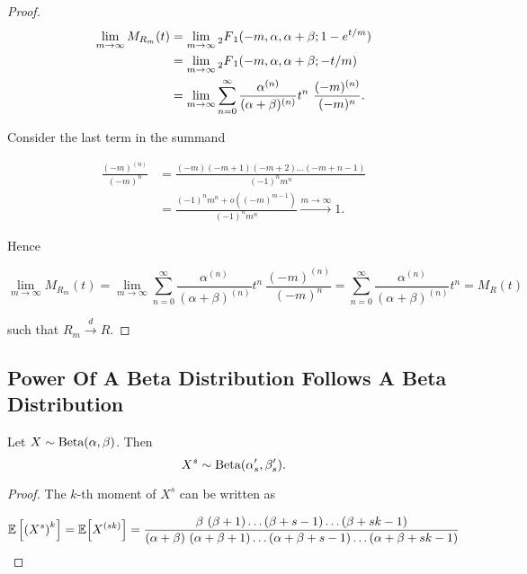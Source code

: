 \documentclass[../../main.tex]{subfiles}
\begin{document}
\begin{proof}
    \begin{equation}
        \begin{split}
            \lim_{m \rightarrow \infty} M_{R_m}(t) &= \lim_{m \rightarrow \infty} \prescript{}{2}{F}_1(-m, \alpha, \alpha + \beta; 1 - e^{t / m})\\
            &= \lim_{m \rightarrow \infty} \prescript{}{2}{F}_1(-m, \alpha, \alpha + \beta; - t/ m) \\
            &= \lim_{m \rightarrow \infty}\sum^{\infty}_{n=0} \frac{\alpha^{(n)}}{(\alpha + \beta)^{(n)}} t^n \  \frac{(-m)^{(n)}}{(-m)^n}.
        \end{split}
    \end{equation}

    
    Consider the last term in the summand 

    \begin{equation}
        \begin{split}
            \frac{(-m)^{(n)}}{(-m)^n} &= \frac{(-m)(-m + 1)(-m + 2)\ldots(-m + n - 1)}{(-1)^n m^n} \\
            &= \frac{(-1)^n m^n + o((-m)^{m - 1})}{(-1)^n m^n} \xrightarrow{m\rightarrow \infty} 1.
        \end{split}
    \end{equation}

    Hence 

    \begin{equation}
        \lim_{m \rightarrow \infty} M_{R_m}(t) = \lim_{m \rightarrow \infty}\sum^{\infty}_{n=0} \frac{\alpha^{(n)}}{(\alpha + \beta)^{(n)}} t^n \  \frac{(-m)^{(n)}}{(-m)^n} = \sum^{\infty}_{n=0} \frac{\alpha^{(n)}}{(\alpha + \beta)^{(n)}} t^n = M_R(t)
    \end{equation}

    such that $R_m \xrightarrow{d} R$.
\end{proof}

\subsection{Power Of A Beta Distribution Follows A Beta Distribution}

\begin{lemma}
    Let $X \sim \text{Beta}(\alpha, \beta)$. Then \begin{equation}
        X^s \sim \text{Beta}(\alpha'_s, \beta'_s).
    \end{equation}
\end{lemma}

\begin{proof}
    The $k$-th moment of $X^s$ can be written as

    \begin{equation}
        \mathbb{E}\left[\left(X^s\right)^k\right] = \mathbb{E}\Big[X^{(sk)}\Big] = \frac{\beta \ (\beta + 1) \ldots (\beta + s - 1) \ldots (\beta + s k - 1) }{(\alpha + \beta) \ (\alpha + \beta + 1) \ldots (\alpha + \beta + s - 1) \ldots (\alpha + \beta + s k - 1) }
    \end{equation}
\end{proof}
\end{document}
